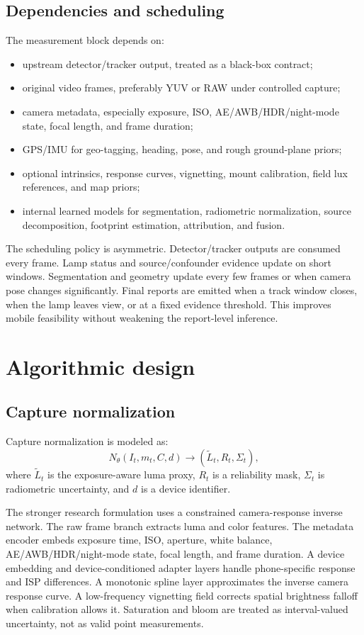 \documentclass[11pt]{article}
\begin{document}
\subsection{Dependencies and scheduling}

The measurement block depends on:
\begin{itemize}
  \item upstream detector/tracker output, treated as a black-box contract;
  \item original video frames, preferably YUV or RAW under controlled capture;
  \item camera metadata, especially exposure, ISO, AE/AWB/HDR/night-mode state, focal length, and frame duration;
  \item GPS/IMU for geo-tagging, heading, pose, and rough ground-plane priors;
  \item optional intrinsics, response curves, vignetting, mount calibration, field lux references, and map priors;
  \item internal learned models for segmentation, radiometric normalization, source decomposition, footprint estimation, attribution, and fusion.
\end{itemize}

The scheduling policy is asymmetric. Detector/tracker outputs are consumed every frame. Lamp status and source/confounder evidence update on short windows. Segmentation and geometry update every few frames or when camera pose changes significantly. Final reports are emitted when a track window closes, when the lamp leaves view, or at a fixed evidence threshold. This improves mobile feasibility without weakening the report-level inference.

\section{Algorithmic design}

\subsection{Capture normalization}

Capture normalization is modeled as:
\[
N_{\theta}(I_t,m_t,C,d) \rightarrow (\widetilde{L}_t,R_t,\Sigma_t),
\]
where \(\widetilde{L}_t\) is the exposure-aware luma proxy, \(R_t\) is a reliability mask, \(\Sigma_t\) is radiometric uncertainty, and \(d\) is a device identifier.

The stronger research formulation uses a constrained camera-response inverse network. The raw frame branch extracts luma and color features. The metadata encoder embeds exposure time, ISO, aperture, white balance, AE/AWB/HDR/night-mode state, focal length, and frame duration. A device embedding and device-conditioned adapter layers handle phone-specific response and ISP differences. A monotonic spline layer approximates the inverse camera response curve. A low-frequency vignetting field corrects spatial brightness falloff when calibration allows it. Saturation and bloom are treated as interval-valued uncertainty, not as valid point measurements.
\end{document}
